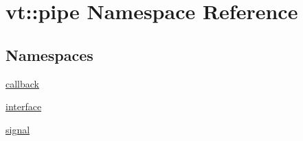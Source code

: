 \hypertarget{namespacevt_1_1pipe}{}\section{vt\+:\+:pipe Namespace Reference}
\label{namespacevt_1_1pipe}
\subsection*{Namespaces}
\begin{DoxyCompactItemize}
\item 
 \hyperlink{namespacevt_1_1pipe_1_1callback}{callback}
\item 
 \hyperlink{namespacevt_1_1pipe_1_1interface}{interface}
\item 
 \hyperlink{namespacevt_1_1pipe_1_1signal}{signal}
\end{DoxyCompactItemize}
